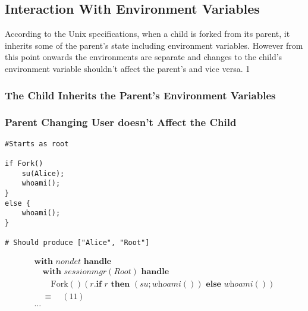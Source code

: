 \documentclass[logo,bsc,singlespacing,parskip]{infthesis}
\begin{document}
\subsection*{Interaction With Environment Variables}
According to the Unix specifications, when a child is forked from its parent, it inherits some of the parent's state including environment variables. However from this point onwards the environments are separate and changes to the child's environment variable shouldn't affect the parent's and vice versa.
1


\subsubsection*{The Child Inherits the Parent's Environment Variables}

\subsubsection*{Parent Changing User doesn't Affect the Child}
\begin{lstlisting}
#Starts as root

if Fork()
    su(Alice);
    whoami();
}
else {
    whoami();
}

# Should produce ["Alice", "Root"]
\end{lstlisting}


\[
\begin{array}{l}
\textbf{with } \mathit{nondet} \textbf{ handle } \\
\quad \textbf{with } \mathit{sessionmgr(Root)} \textbf{ handle } \\
\quad\quad \text{Fork}()(r. \textbf{if } r \textbf{ then } (su; \textit{whoami}()) \textbf{ else } \textit{whoami}()) \\[5pt]
\quad\equiv\quad (11) \\
\ldots
\end{array}
\]
\end{document}
